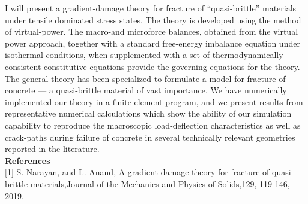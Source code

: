 I will present a gradient-damage theory for fracture of “quasi-brittle” materials under tensile dominated stress states.  The theory is developed using the method of virtual-power.  The macro-and microforce balances, obtained from the virtual power approach, together with a standard free-energy imbalance equation under isothermal conditions, when supplemented with a set of thermodynamically-consistent  constitutive  equations  provide  the  governing  equations  for  the theory.  The general theory has been specialized to formulate a model for fracture of concrete --- a quasi-brittle material of vast importance.  We have numerically implemented our theory in a finite element program, and we present results from representative numerical calculations which show the ability of our simulation capability to reproduce the macroscopic load-deflection characteristics as well as crack-paths during failure of concrete in several technically relevant geometries reported in the literature.\\

\noindent\textbf{References}\\
$[$1$]$ S. Narayan, and L. Anand, A gradient-damage theory for fracture of quasi-brittle materials,Journal of the Mechanics and Physics of Solids,129, 119-146, 2019.
